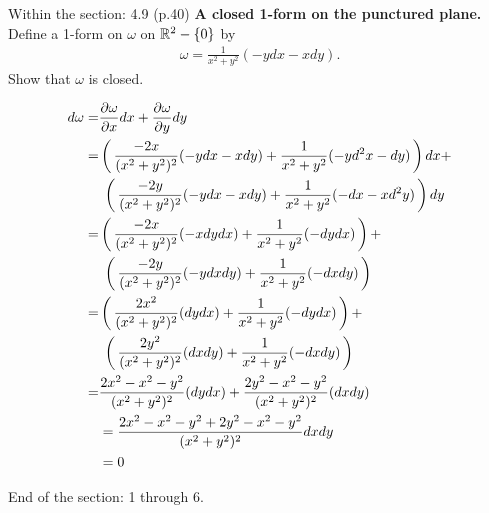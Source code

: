 \documentclass[10pt,a4paper]{report}
\newcommand{\BLUE}[1]{\textcolor{blue}{#1}}
\begin{document}
\begin{description}
	\item Within the section: 4.9 (p.40) \textbf{A closed 1-form on the punctured plane.}  Define a 1-form on $\omega$ on $\mathbb{R}^2-\{0\}$ by 
	\begin{align*}
		\omega = \frac{1}{x^2+y^2}
(-ydx-xdy).	
\end{align*}Show that $\omega$ is closed.

\BLUE{\begin{align*}
	d\omega = &\frac{\partial \omega}{\partial x}dx+\frac{\partial \omega}{\partial y}dy \\
	= &\left (\, \frac{-2x}{(x^2+y^2)^2}(-ydx-xdy)+\frac{1}{x^2+y^2}(-yd^2x-dy) \,\right )dx+ \\
	&\; \left (\, \frac{-2y}{(x^2+y^2)^2}(-ydx-xdy)+\frac{1}{x^2+y^2}(-dx-xd^2y) \,\right )dy\\
	= &\left (\, \frac{-2x}{(x^2+y^2)^2}(-xdydx)+\frac{1}{x^2+y^2}(-dydx) \,\right )+ \\
	&\; \left (\, \frac{-2y}{(x^2+y^2)^2}(-ydxdy)+\frac{1}{x^2+y^2}(-dxdy) \,\right )\\
	= &\left (\, \frac{2x^2}{(x^2+y^2)^2}(dydx)+\frac{1}{x^2+y^2}(-dydx) \,\right )+ \\
	&\; \left (\, \frac{2y^2}{(x^2+y^2)^2}(dxdy)+\frac{1}{x^2+y^2}(-dxdy) \,\right ) \\
	= &\frac{2x^2-x^2-y^2}{(x^2+y^2)^2}(dydx)+ \frac{2y^2-x^2-y^2}{(x^2+y^2)^2}(dxdy) \\
	&= \frac{2x^2-x^2-y^2+2y^2-x^2-y^2}{(x^2+y^2)^2} dxdy\\
	&=0
\end{align*}
}
\end{description}

End of the section: 1 through 6.
\end{document}
